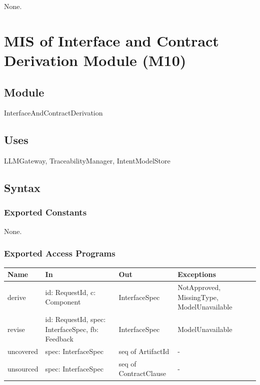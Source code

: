 \documentclass[12pt, titlepage]{article}
\begin{document}
None.

\newpage
\section{MIS of Interface and Contract Derivation Module (M10)} \label{MISDerive}

\subsection{Module}

InterfaceAndContractDerivation

\subsection{Uses}

LLMGateway, TraceabilityManager, IntentModelStore

\subsection{Syntax}

\subsubsection{Exported Constants}

None.

\subsubsection{Exported Access Programs}

\begin{center}
\small
\begin{tabular}{>{\raggedright\arraybackslash}p{3.7cm} >{\raggedright\arraybackslash}p{3.8cm} >{\raggedright\arraybackslash}p{3.6cm} >{\raggedright\arraybackslash}p{3.7cm}}
\hline
\textbf{Name} & \textbf{In} & \textbf{Out} & \textbf{Exceptions} \\
\hline
derive & id: RequestId, c: Component & InterfaceSpec & NotApproved, MissingType, ModelUnavailable \\
revise & id: RequestId, spec: InterfaceSpec, fb: Feedback & InterfaceSpec & ModelUnavailable \\
uncovered & spec: InterfaceSpec & seq of ArtifactId & - \\
unsourced & spec: InterfaceSpec & seq of ContractClause & - \\
\hline
\end{tabular}
\end{center}
\end{document}
